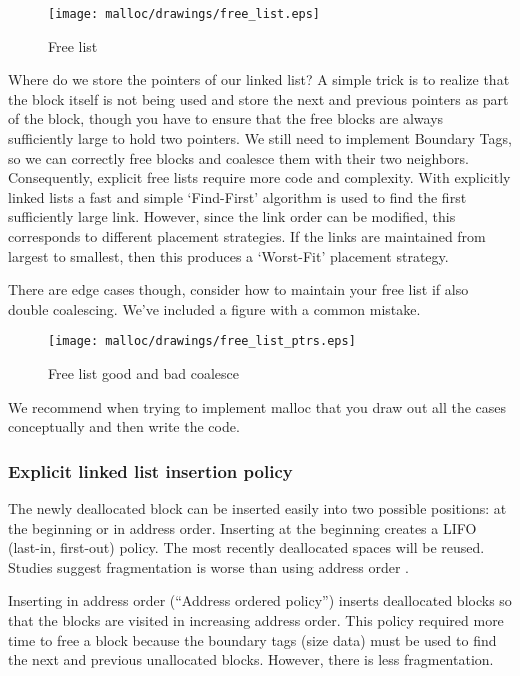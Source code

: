 \begin{figure}[H]
\centering
\texttt{[image: malloc/drawings/free\_list.eps]}
\caption{Free list}
\end{figure}


Where do we store the pointers of our linked list?
A simple trick is to realize that the block itself is not being used and store the next and previous pointers as part of the block, though you have to ensure that the free blocks are always sufficiently large to hold two pointers.
We still need to implement Boundary Tags, so we can correctly free blocks and coalesce them with their two neighbors.
Consequently, explicit free lists require more code and complexity.
With explicitly linked lists a fast and simple `Find-First' algorithm is used to find the first sufficiently large link.
However, since the link order can be modified, this corresponds to different placement strategies.
If the links are maintained from largest to smallest, then this produces a `Worst-Fit' placement strategy.

There are edge cases though, consider how to maintain your free list if also double coalescing.
We've included a figure with a common mistake.

\begin{figure}[H]
\centering
\texttt{[image: malloc/drawings/free\_list\_ptrs.eps]}
\caption{Free list good and bad coalesce}
\end{figure}

We recommend when trying to implement malloc that you draw out all the cases conceptually and then write the code.

\subsubsection{Explicit linked list insertion policy}

The newly deallocated block can be inserted easily into two possible positions: at the beginning or in address order.
Inserting at the beginning creates a LIFO (last-in, first-out) policy.
The most recently deallocated spaces will be reused. Studies suggest fragmentation is worse than using address order \cite{10.1007/3-540-60368-9_19}.

Inserting in address order (``Address ordered policy'') inserts deallocated blocks so that the blocks are visited in increasing address order.
This policy required more time to free a block because the boundary tags (size data) must be used to find the next and previous unallocated blocks.
However, there is less fragmentation.

